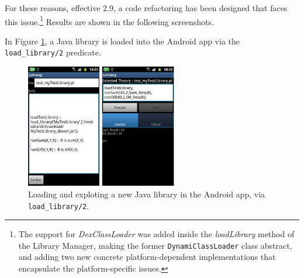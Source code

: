 For these reasons, effective \tuprolog{} 2.9, a code refactoring has been designed that faces this issue.\footnote{The support for  \textit{DexClassLoader} was added inside the \textit{loadLibrary} method of the Library Manager, making the former \texttt{DynamiClassLoader} class abstract, and adding two new concrete platform-dependent implementations that encapsulate the platform-specific issues.}
Results are shown in the following screenshots.

In Figure \ref{fig:android9a}, a Java library is loaded into the Android app via the \texttt{load\_library/2} predicate.
%
\begin{figure}
\centering
  \includegraphics[width=250px]{images/android9a.png}
  \caption{Loading and exploting a new Java library in the Android app, via \texttt{load\_library/2}.}\label{fig:android9a}
\end{figure}


